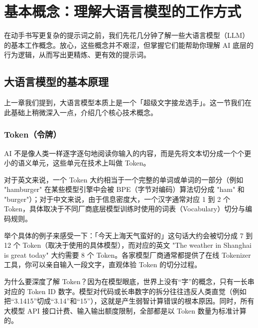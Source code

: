 % 
% 


\chapter{基本概念：理解大语言模型的工作方式}
\label{ch:basic-concepts}

在动手书写更复杂的提示词之前，我们先花几分钟了解一些大语言模型（LLM）的基本工作概念。放心，这些概念并不艰涩，但掌握它们能帮助你理解 AI 底层的行为逻辑，从而写出更精炼、更有效的提示词。

\section{大语言模型的基本原理}

上一章我们提到，大语言模型本质上是一个「超级文字接龙选手」。这一节我们在此基础上稍微深入一点，介绍几个核心技术概念。

\subsection*{Token（令牌）}
\label{sec:token}

AI 不是像人类一样逐字逐句地阅读你输入的内容，而是先将文本切分成一个个更小的语义单元，这些单元在技术上叫做 Token。

对于英文来说，一个 Token 大约相当于一个完整的单词或单词的一部分（例如 "hamburger" 在某些模型引擎中会被 BPE（字节对编码）算法切分成 "ham" 和 "burger"）；对于中文来说，由于信息密度大，一个汉字通常对应 1 到 2 个 Token，具体取决于不同厂商底层模型训练时使用的词表（Vocabulary）切分与编码规则。

举个具体的例子来感受一下：「今天上海天气蛮好的」这句话大约会被切分成 7 到 12 个 Token（取决于使用的具体模型），而对应的英文 "The weather in Shanghai is great today" 大约需要 8 个 Token。各家模型厂商通常都提供了在线 Tokenizer 工具，你可以亲自输入一段文字，直观体验 Token 的切分过程。

\begin{tipbox}
为什么要深度了解 Token？因为在模型眼底，世界上没有“字”的概念，只有一长串对应的 Token ID 数字。模型对代码或长串数字的拆分往往违反人类直觉（例如把“3.1415”切成“3.14”和“15”），这就是产生弱智计算错误的根本原因。同时，所有大模型 API 接口计费、输入输出额度限制，全部都是以 Token 数量为标准计算的。
\end{tipbox}

